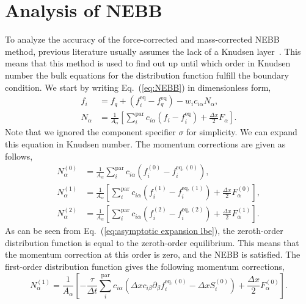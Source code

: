 \documentclass[fleqn,a4paper]{article} %
\numberwithin{equation}{section} %
\numberwithin{figure}{section} %
\numberwithin{table}{section} %
\numberwithin{algorithm}{section} %
\begin{document}
\section{Analysis of NEBB}
To analyze the accuracy of the force-corrected and mass-corrected NEBB method, previous literature usually assumes the lack of a Knudsen layer~\cite{junk_asymptotic_2005}. This means that this method is used to find out up until which order in Knudsen number the bulk equations for the distribution function fulfill the boundary condition. We start by writing Eq.~(\ref{eq:NEBB}) in dimensionless form, 
\begin{equation}
\begin{split}
    f_i &= f_q + \left(f_i^{\text{eq}} - f_q^{\text{eq}}\right) - w_i c_{i\alpha} N_\alpha,\\
    N_\alpha &= \frac{1}{A_\alpha}\left[\sum_i^\text{par}c_{i\alpha}\left(f_i - f_i^{\text{eq}}\right)+ \frac{\Delta x}{2}F_\alpha\right].
\end{split}
\end{equation}
Note that we ignored the component specifier $\sigma$ for simplicity. We can expand this equation in Knudsen number. The momentum corrections are given as follows,
\begin{equation}
\begin{split}
    N_\alpha^{(0)} &= \frac{1}{A_\alpha}\sum_i^\text{par}c_{i\alpha}\left(f_i^{(0)} - f_i^{\text{eq},(0)}\right),\\
    N_\alpha^{(1)} &= \frac{1}{A_\alpha}\left[\sum_i^\text{par}c_{i\alpha}\left(f_i^{(1)} - f_i^{\text{eq},(1)}\right)+ \frac{\Delta x}{2}F_\alpha^{(0)}\right],\\
    N_\alpha^{(2)} &= \frac{1}{A_\alpha}\left[\sum_i^\text{par}c_{i\alpha}\left(f_i^{(2)} - f_i^{\text{eq},(2)}\right)+ \frac{\Delta x}{2}F_\alpha^{(1)}\right].
\end{split}
\end{equation}
As can be seen from Eq.~(\ref{eq:asymptotic expansion lbe}), the zeroth-order distribution function is equal to the zeroth-order equilibrium. This means that the momentum correction at this order is zero, and the NEBB is satisfied. The first-order distribution function gives the following momentum corrections,
\begin{equation}
    N_\alpha^{(1)} = \frac{1}{A_\alpha}\left[ - \frac{\tau}{\Delta t}\sum_i^\text{par}c_{i\alpha}\left(\Delta x c_{i\beta}\partial_\beta f_i^{\text{eq}, (0)}-\Delta xS_i^{(0)}\right)+ \frac{\Delta x}{2}F_\alpha^{(0)}\right].
\end{equation}
\end{document}
